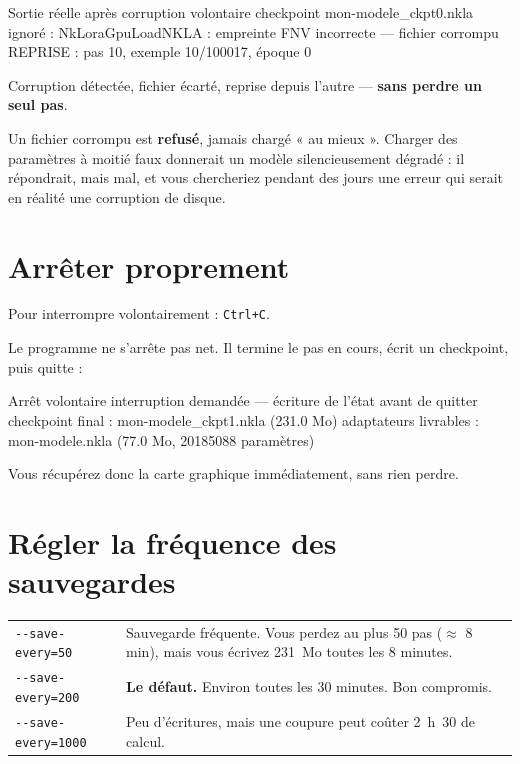 \begin{nkcode}[]{Sortie réelle après corruption volontaire}
checkpoint mon-modele_ckpt0.nkla ignoré :
  NkLoraGpuLoadNKLA : empreinte FNV incorrecte — fichier corrompu
REPRISE : pas 10, exemple 10/100017, époque 0
\end{nkcode}

Corruption détectée, fichier écarté, reprise depuis l'autre — \textbf{sans
perdre un seul pas}.

\begin{nkpiege}
Un fichier corrompu est \textbf{refusé}, jamais chargé « au mieux ». Charger des
paramètres à moitié faux donnerait un modèle silencieusement dégradé : il
répondrait, mais mal, et vous chercheriez pendant des jours une erreur qui
serait en réalité une corruption de disque.
\end{nkpiege}

\section{Arrêter proprement}

Pour interrompre volontairement : \texttt{Ctrl+C}.

Le programme ne s'arrête pas net. Il termine le pas en cours, écrit un
checkpoint, puis quitte :

\begin{nkcode}[]{Arrêt volontaire}
interruption demandée — écriture de l'état avant de quitter
checkpoint final : mon-modele_ckpt1.nkla (231.0 Mo)
adaptateurs livrables : mon-modele.nkla (77.0 Mo, 20185088 paramètres)
\end{nkcode}

Vous récupérez donc la carte graphique immédiatement, sans rien perdre.

\section{Régler la fréquence des sauvegardes}

\begin{center}
\begin{tabular}{lp{9.6cm}}
\toprule
\texttt{-{}-save-every=50} & Sauvegarde fréquente. Vous perdez au plus 50 pas
   ($\approx$ 8 min), mais vous écrivez 231~Mo toutes les 8 minutes. \\
\texttt{-{}-save-every=200} & \textbf{Le défaut.} Environ toutes les 30 minutes.
   Bon compromis. \\
\texttt{-{}-save-every=1000} & Peu d'écritures, mais une coupure peut coûter
   2~h~30 de calcul. \\
\bottomrule
\end{tabular}
\end{center}

